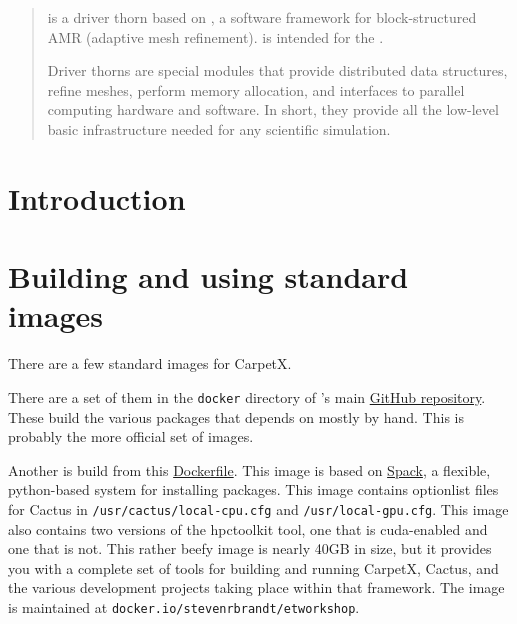 \newpage

\begin{abstract}

\CarpetX\space is a \href{https://www.cactuscode.org/index.html}{\Cactus} driver thorn based on \href{https://amrex-codes.github.io/}{\AMReX}, a software framework for block-structured AMR (adaptive mesh refinement). \CarpetX\space is intended for the \href{https://einsteintoolkit.org/}{\ETK}.

Driver thorns are special modules that provide distributed data structures, refine meshes, perform memory allocation, and interfaces to parallel computing hardware and software. In short, they provide all the low-level basic infrastructure needed for any scientific simulation.

\end{abstract}

\newpage

\tableofcontents

\newpage

\section{Introduction}
\label{sec:intro}


\section{Building and using standard images}
\label{sec:std_imgs}

There are a few standard images for CarpetX.

There are a set of them in the \texttt{docker} directory of \CarpetX's main \href{https://github.com/eschnett/CarpetX}{GitHub repository}. These build the various packages that \CarpetX\space depends on mostly by hand. This is probably the more official set of images.

Another is build from this \href{https://github.com/stevenrbrandt/carpetx-install}{Dockerfile}. This image is based on \href{https://github.com/spack/spack}{Spack}, a flexible, python-based system for installing packages. This image contains optionlist files for Cactus in \texttt{/usr/cactus/local-cpu.cfg} and \texttt{/usr/local-gpu.cfg}. This image also contains two versions of the hpctoolkit tool, one that is cuda-enabled and one that is not. This rather beefy image is nearly 40GB in size, but it provides you with a complete set of tools for building and running CarpetX, Cactus, and the various development projects taking place within that framework. The image is maintained at \texttt{docker.io/stevenrbrandt/etworkshop}.

